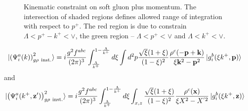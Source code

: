 \documentclass[aps,prd,amsmath,amssymb,nofootinbib]{revtex4-2}
\def\v#1{\mathbf{#1}}
\numberwithin{equation}{section}
\begin{document}
\begin{figure}
\caption{Kinematic constraint on soft gluon plus momentum. The intersection of shaded regions defines allowed range of integration with respect to $p^+$.
  The red region is due to constrain $ \Lambda < p^+ - k^+ < \vee $, the green region --  $ \Lambda < p^+  < \vee $
and  $ \Lambda <  k^+ < \vee$.
}
\end{figure}
\begin{align}\label{oneginst2}
  \ket{ \left(\Psi^{a}_{i}(k) \right)^{2}_{g \rho\ {\rm inst.} } }%
   &= i \frac{g^2 f^{abc}}{(2\pi)^3} 
   \int_{\frac{\Lambda}{k^{+}}}^{1-\frac{\Lambda} {k^{+}}} d \xi %
   \int d^2p %
   \frac{\sqrt{\xi} (1+\xi) } {(1-\xi)^2} \frac{\rho^c(-\v{p}+\v{k})}{\xi \v{k}^2 - \v{p}^2} 
   \ket{g_{i}^{b}(\xi k^+,\v{p})} 
\end{align}
and 
\begin{align}%
 \label{Eq:onegluoninstX2}
  \ket{ \left(\Psi^{a}_{i}(k^+, \v{z}') \right)^{2}_{g \rho\ {\rm inst.} } }%
   &= 
   i \frac{g^2 f^{abc}}{(2\pi)^3} \int_{ \frac{\Lambda}{k^+}   }^{ 1- \frac{\Lambda  }{k^+} } %
   d \xi \int_{x,z} %
   \frac{\sqrt{\xi} (1+\xi) } {(1-\xi)^2} \frac{\rho^c(\v{x})}{\xi X^{2} - X^{'2} } 
   \ket{g_{i}^{b}(\xi k^+,\v{z})} 
\end{align}
\end{document}
